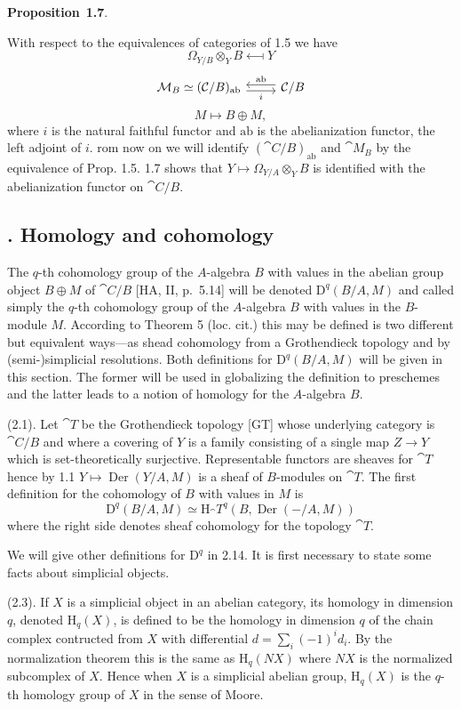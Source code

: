 \documentclass[10pt,reqno]{amsart}
\DeclareMathOperator{\Der}{Der}
\newenvironment{prop}[1]{
\par\medskip\noindent\textbf{Proposition}~\textbf{#1}.\,\itshape
}
\newcommand{\cat}{\mathcal}
\newcommand{\C}{\cat{C}}
\newcommand{\M}{\cat{M}}
\newcommand{\T}{\cat{T}}
\renewcommand{\H}{\mathrm{H}}
\newcommand{\D}{\mathrm{D}}
\newcommand{\Diff}{\Omega}
\begin{document}
\begin{prop}{1.7}
With respect to the equivalences of categories of 1.5 we have
\[
  \Diff_{Y/B}\otimes_Y B\longmapsfrom Y
\]
\[
  \begin{tikzcd}
  {\M_B\simeq(\C/B)_\mathrm{ab}}\ar[r,"i"',shift right]
  & {\C/B}\ar[l,"\mathrm{ab}"',shift right]
  \end{tikzcd}
\]
\[
  M\longmapsto B\oplus M,
\]
where $i$ is the natural faithful functor and $\mathrm{ab}$ is the abelianization functor,
the left adjoint of $i$.
\end{prop}

From now on we will identify $(\C/B)_\mathrm{ab}$ and $\M_B$ by the equivalence of
Prop. 1.5. 1.7 shows that $Y\mapsto\Diff_{Y/A}\otimes_Y B$ is identified with the
abelianization functor on $\C/B$.

\subsection*{. Homology and cohomology}

The $q$-th cohomology group of the $A$-algebra $B$ with values in the abelian group
object $B\oplus M$ of $\C/B$ [HA, II, p.~5.14] will be denoted
$\D^q(B/A,M)$ and called simply the $q$-th cohomology group of the $A$-algebra $B$
with values in the $B$-module $M$. According to Theorem 5 (loc. cit.) this may be
defined is two different but equivalent ways---as shead cohomology from a
Grothendieck topology and by (semi-)simplicial resolutions. Both definitions for
$\D^q(B/A,M)$ will be given in this section. The former will be used in globalizing
the definition to preschemes and the latter leads to a notion of homology for the
$A$-algebra $B$.

(2.1). Let $\T$ be the Grothendieck topology [GT] whose underlying
category is $\C/B$ and where a covering of $Y$ is a family consisting of a single map
$Z\to Y$ which is set-theoretically surjective. Representable functors are sheaves for
$\T$ hence by 1.1 $Y\mapsto\Der(Y/A,M)$ is a sheaf of $B$-modules on $\T$.
The first definition for the cohomology of $B$ with values in $M$ is
\[
  \D^q(B/A,M)\simeq\H_\T^q(B,\Der(-/A,M))\tag{2.2}
\]
where the right side denotes sheaf cohomology for the topology $\T$.

We will give other definitions for $\D^q$ in 2.14. It is first necessary to state some
facts about simplicial objects.

(2.3). If $X$ is a simplicial object in an abelian category, its homology in
dimension $q$, denoted $\H_q(X)$, is defined to be the homology in dimension $q$ of
the chain complex contructed from $X$ with differential $d=\sum_i(-1)^i d_i$. By the
normalization theorem this is the same as $\H_q(NX)$ where $NX$ is the normalized
subcomplex of $X$. Hence when $X$ is a simplicial abelian group, $\H_q(X)$ is the
$q$-th homology group of $X$ in the sense of Moore.
\end{document}
